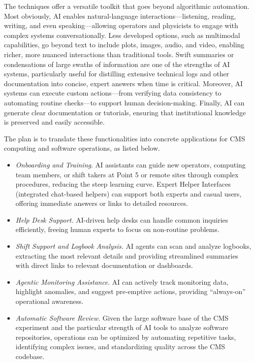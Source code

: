 The techniques offer a versatile toolkit that goes beyond algorithmic automation. Most obviously, \gls{AI} enables natural-language interactions---listening, reading, writing, and even speaking---allowing operators and physicists to engage with complex systems conversationally. Less developed options, such as multimodal capabilities, go beyond text to include plots, images, audio, and video, enabling richer, more nuanced interactions than traditional tools. Swift summaries or condensations of large swaths of information are one of the strengths of \gls{AI} systems, particularly useful for distilling extensive technical logs and other documentation into concise, expert answers when time is critical. Moreover, \gls{AI} systems can execute custom actions---from verifying data consistency to automating routine checks---to support human decision-making. Finally, \gls{AI} can generate clear documentation or tutorials, ensuring that institutional knowledge is preserved and easily accessible.

The plan is to translate these functionalities into concrete applications for CMS computing and software operations, as listed below.

\begin{itemize}

\item {\em Onboarding and Training}. \gls{AI} assistants can guide new operators, computing team members, or shift takers at Point 5 or remote sites through complex procedures, reducing the steep learning curve. Expert Helper Interfaces (integrated chat-based helpers) can support both experts and casual users, offering immediate answers or links to detailed resources.

\item {\em Help Desk Support.} \gls{AI}-driven help desks can handle common inquiries efficiently, freeing human experts to focus on non-routine problems. 

\item {\em Shift Support and Logbook Analysis.} \gls{AI} agents can scan and analyze logbooks, extracting the most relevant details and providing streamlined summaries with direct links to relevant documentation or dashboards.

\item {\em Agentic Monitoring Assistance.} \gls{AI} can actively track monitoring data, highlight anomalies, and suggest pre-emptive actions, providing ``always-on'' operational awareness. 

\item {\em Automatic Software Review.} Given the large software base of the CMS experiment and the particular strength of \gls{AI} tools to analyze software repositories, operations can be optimized by automating repetitive tasks, identifying complex issues, and standardizing quality across the CMS codebase.

\end{itemize}

